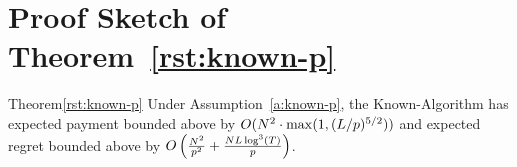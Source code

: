 \section{Proof Sketch of Theorem~\ref{rst:known-p}}
\label{sec:discussion-proof2}


\begin{rtheorem}{Theorem}{\ref{rst:known-p}}
Under Assumption~\ref{a:known-p}, the Known-\MinProb Algorithm has
expected payment bounded above by  
$O(N^2 \cdot \max(1,(L/p)^{5/2}))$ 
and expected regret bounded above by
$O \left( \frac{N^2}{p^2}
  +\frac{N L \log^3(T)}{p}\right)$.
\end{rtheorem}

